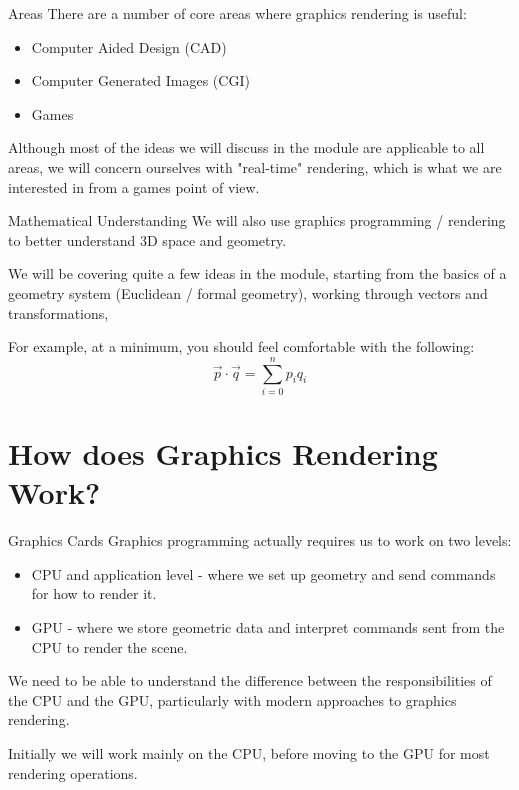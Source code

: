 \documentclass[handout,18pt]{beamer}
\begin{document}
\begin{frame}{Areas}
\pause
There are a number of core areas where graphics rendering is useful:
\begin{itemize}
\pause \item Computer Aided Design (CAD)
\pause \item Computer Generated Images (CGI)
\pause \item Games
\end{itemize}
\pause

\vspace{11pt}
Although most of the ideas we will discuss in the module are applicable to all areas, we will concern ourselves with "real-time" rendering,  which is what we are interested in from a games point of view.
\end{frame}

\begin{frame}{Mathematical Understanding}
\pause
We will also use graphics programming / rendering to better understand 3D space and geometry.
\pause

\vspace{11pt}
We will be covering quite a few ideas in the module, starting from the basics of a geometry system (Euclidean / formal geometry), working through vectors and transformations, 
\pause

\vspace{11pt}
For example, at a minimum, you should feel comfortable with the following:
\[
\vec{p} \cdot \vec{q} = \displaystyle\sum\limits_{i=0}^n p_i q_i
\]
\end{frame}

\section{How does Graphics Rendering Work?}

\begin{frame}{Graphics Cards}
\pause
Graphics programming actually requires us to work on two levels:
\begin{itemize}
\item CPU and application level - where we set up geometry and send commands for how to render it.
\item GPU - where we store geometric data and interpret commands sent from the CPU to render the scene.
\end{itemize}
\pause

\vspace{11pt}
We need to be able to understand the difference between the responsibilities of the CPU and the GPU, particularly with modern approaches to graphics rendering.
\pause

\vspace{11pt}
Initially we will work mainly on the CPU, before moving to the GPU for most rendering operations.
\end{frame}
\end{document}

